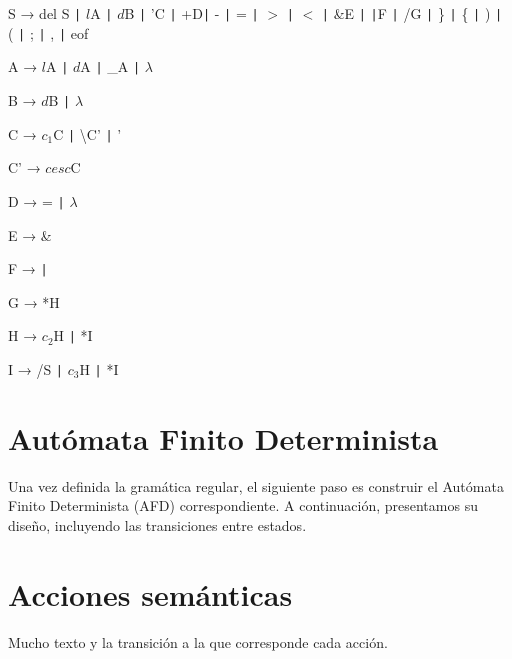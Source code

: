 \documentclass{article}
\begin{document}
\begin{tcolorbox}[title=Gramática Regular]
    \hspace{0.5cm} S → del S \texttt{|} $l$A \texttt{|} $d$B \texttt{|} 'C \texttt{|} +D\texttt{|} - \texttt{|} = \texttt{|} \(>\) \texttt{|} \(<\) \texttt{|} \&E \texttt{|} \texttt{|}F \texttt{|} /G \texttt{|} \} \texttt{|} \{ \texttt{|} ) \texttt{|} ( \texttt{|} ; \texttt{|} , \texttt{|} eof
    
    \hspace{0.5cm} A → $l$A \texttt{|} $d$A \texttt{|} \_A \texttt{|} \( \lambda \)
    
    \hspace{0.5cm} B → $d$B \texttt{|} \( \lambda \)
    
    \hspace{0.5cm} C → $c_1$C \texttt{|} \textbackslash C' \texttt{|} '
    
    \hspace{0.5cm} C' → $cesc$C
    
    \hspace{0.5cm} D → = \texttt{|} \( \lambda \)
    
    \hspace{0.5cm} E → \&
    
    \hspace{0.5cm} F → \texttt{|}
    
    \hspace{0.5cm} G → *H
    
    \hspace{0.5cm} H → $c_2$H \texttt{|} *I
    
    \hspace{0.5cm} I → /S \texttt{|} $c_3$H \texttt{|} *I
\end{tcolorbox}

\section{Autómata Finito Determinista}
Una vez definida la gramática regular, el siguiente paso es construir el Autómata Finito Determinista (AFD) correspondiente. A continuación, presentamos su diseño, incluyendo las transiciones entre estados.

\vspace{0.1cm}



\section{Acciones semánticas}
Mucho texto y la transición a la que corresponde cada acción.
\end{document}
